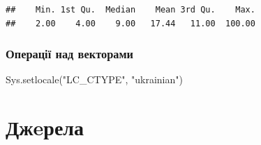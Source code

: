 \documentclass[
]{book}
\newenvironment{Shaded}{\begin{snugshade}}{\end{snugshade}}
\newcommand{\FunctionTok}[1]{\textcolor[rgb]{0.00,0.00,0.00}{#1}}
\newcommand{\NormalTok}[1]{#1}
\newcommand{\StringTok}[1]{\textcolor[rgb]{0.31,0.60,0.02}{#1}}
\begin{document}
\begin{verbatim}
##    Min. 1st Qu.  Median    Mean 3rd Qu.    Max. 
##    2.00    4.00    9.00   17.44   11.00  100.00
\end{verbatim}

\hypertarget{chapter323}{%
\subsection{Операції над векторами}\label{chapter323}}

\begin{Shaded}
\begin{Highlighting}[]
\FunctionTok{Sys.setlocale}\NormalTok{(}\StringTok{"LC\_CTYPE"}\NormalTok{, }\StringTok{"ukrainian"}\NormalTok{)}
\end{Highlighting}
\end{Shaded}

\hypertarget{ux434ux436eux440ux435ux43bux430}{%
\chapter*{Джeрела}\label{ux434ux436eux440ux435ux43bux430}}

  
\end{document}
